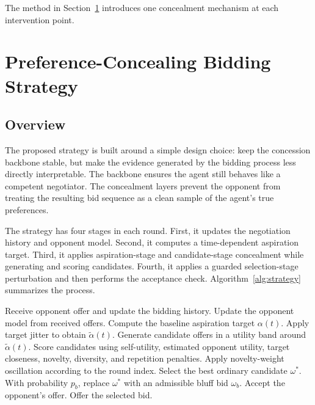 \documentclass[runningheads]{llncs}
\begin{document}
The method in Section~\ref{sec:method} introduces one concealment mechanism at each intervention point.

\section{Preference-Concealing Bidding Strategy}
\label{sec:method}

\subsection{Overview}

The proposed strategy is built around a simple design choice: keep the concession backbone stable, but make the evidence generated by the bidding process less directly interpretable. The backbone ensures the agent still behaves like a competent negotiator. The concealment layers prevent the opponent from treating the resulting bid sequence as a clean sample of the agent's true preferences.

The strategy has four stages in each round. First, it updates the negotiation history and opponent model. Second, it computes a time-dependent aspiration target. Third, it applies aspiration-stage and candidate-stage concealment while generating and scoring candidates. Fourth, it applies a guarded selection-stage perturbation and then performs the acceptance check. Algorithm~\ref{alg:strategy} summarizes the process.

\begin{algorithm}[t]
\caption{Preference-Concealing Bidding Cycle}
\label{alg:strategy}
\begin{algorithmic}[1]
\STATE Receive opponent offer and update the bidding history.
\STATE Update the opponent model from received offers.
\STATE Compute the baseline aspiration target $\alpha(t)$.
\STATE Apply target jitter to obtain $\tilde{\alpha}(t)$.
\STATE Generate candidate offers in a utility band around $\tilde{\alpha}(t)$.
\STATE Score candidates using self-utility, estimated opponent utility, target closeness, novelty, diversity, and repetition penalties.
\STATE Apply novelty-weight oscillation according to the round index.
\STATE Select the best ordinary candidate $\omega^*$.
    \STATE With probability $p_b$, replace $\omega^*$ with an admissible bluff bid $\omega_b$.
\ENDIF
{}
    \STATE Accept the opponent's offer.
\ELSE
    \STATE Offer the selected bid.
\ENDIF
\end{algorithmic}
\end{algorithm}
\end{document}
